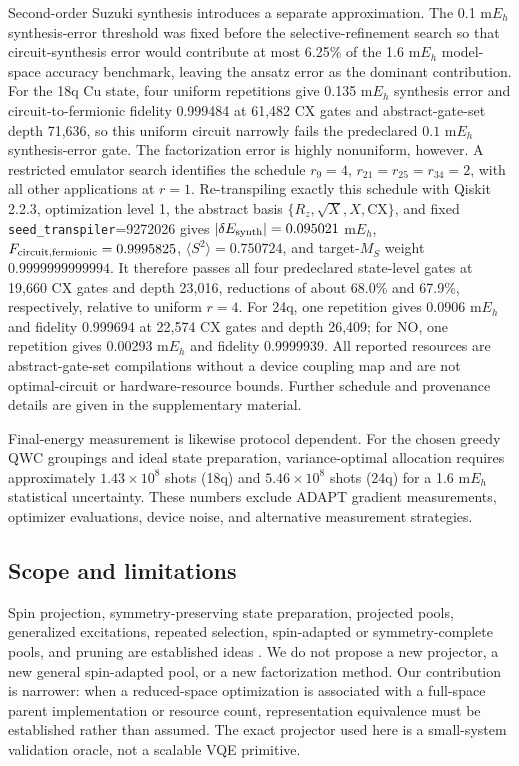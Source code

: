 \documentclass[
 aip,
 jcp,
 amsmath,amssymb,
 preprint
]{revtex4-2}
\begin{document}
Second-order Suzuki synthesis introduces a separate approximation.
The 0.1 m$E_h$ synthesis-error threshold was fixed before the selective-refinement search so that circuit-synthesis error would contribute at most 6.25\% of the 1.6 m$E_h$ model-space accuracy benchmark, leaving the ansatz error as the dominant contribution.
For the 18q Cu state, four uniform repetitions give 0.135 m$E_h$ synthesis error and circuit-to-fermionic fidelity 0.999484 at 61,482 CX gates and abstract-gate-set depth 71,636, so this uniform circuit narrowly fails the predeclared $0.1$ m$E_h$ synthesis-error gate.
The factorization error is highly nonuniform, however.
A restricted emulator search identifies the schedule $r_9=4$, $r_{21}=r_{25}=r_{34}=2$, with all other applications at $r=1$.
Re-transpiling exactly this schedule with Qiskit 2.2.3, optimization level 1, the abstract basis $\{R_z,\sqrt X,X,\mathrm{CX}\}$, and fixed \texttt{seed\_transpiler}=9272026 gives
$|\delta E_{\rm synth}|=0.095021$ m$E_h$,
$F_{\rm circuit,fermionic}=0.9995825$,
$\langle S^2\rangle=0.750724$,
and target-$M_S$ weight $0.9999999999994$.
It therefore passes all four predeclared state-level gates at 19,660 CX gates and depth 23,016, reductions of about 68.0\% and 67.9\%, respectively, relative to uniform $r=4$.
For 24q, one repetition gives 0.0906 m$E_h$ and fidelity 0.999694 at 22,574 CX gates and depth 26,409; for NO, one repetition gives 0.00293 m$E_h$ and fidelity 0.9999939.
All reported resources are abstract-gate-set compilations without a device coupling map and are not optimal-circuit or hardware-resource bounds.
Further schedule and provenance details are given in the supplementary material.

Final-energy measurement is likewise protocol dependent.
For the chosen greedy QWC groupings and ideal state preparation, variance-optimal allocation requires approximately $1.43\times10^8$ shots (18q) and $5.46\times10^8$ shots (24q) for a 1.6 m$E_h$ statistical uncertainty.
These numbers exclude ADAPT gradient measurements, optimizer evaluations, device noise, and alternative measurement strategies.

\subsection{Scope and limitations}

Spin projection, symmetry-preserving state preparation, projected pools, generalized excitations, repeated selection, spin-adapted or symmetry-complete pools, and pruning are established ideas \cite{gard2020symmetry,seki2020symmetry,tsuchimochi2022spinproj,seki2022projection,weaving2023stabilizer,shkolnikov2023roadblocks,burton2023disco,magoulas2026symmetry}.
We do not propose a new projector, a new general spin-adapted pool, or a new factorization method.
Our contribution is narrower: when a reduced-space optimization is associated with a full-space parent implementation or resource count, representation equivalence must be established rather than assumed.
The exact projector used here is a small-system validation oracle, not a scalable VQE primitive.
\end{document}
